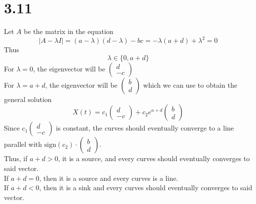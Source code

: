 \documentclass[11pt]{article}
\theoremstyle{mystyle}
\theoremstyle{definition}
\begin{document}
\section*{3.11}
Let $A$ be the matrix in the equation
\[
  |A-\lambda I | = (a-\lambda)(d-\lambda) - bc = -\lambda(a+d) + \lambda^2 = 0
\]
Thus 
\[
  \lambda \in \{0, a+d\}
\]
For $\lambda = 0$, the eigenvector will be 
$\begin{pmatrix}
  d \\
  -c
\end{pmatrix}
$ \\
For $\lambda = a+d$, the eigenvector will be 
$
\begin{pmatrix}
  b \\
  d
\end{pmatrix}
$
which we can use to obtain the general solution 
\[
  X(t) = c_1 \begin{pmatrix}
    d \\
    -c
  \end{pmatrix} + c_2 e^{a+d} 
  \begin{pmatrix}
    b \\ 
    d
  \end{pmatrix}
\]
Since $c_1 
\begin{pmatrix}
  d \\
  -c
\end{pmatrix}
$ is constant, the curves should eventually converge to a line parallel with 
$ \text{sign}(c_2) \cdot 
\begin{pmatrix}
  b \\
  d
\end{pmatrix}$. \\ 
Thus, if $a+d > 0$, it is a source, and every curves should eventually converges to said vector. \\
If $a+d = 0$, then it is a source and every curves is a line. \\
If $a+d < 0$, then it is a sink and every curves should eventually converges to said vector.
\clearpage
\end{document}

